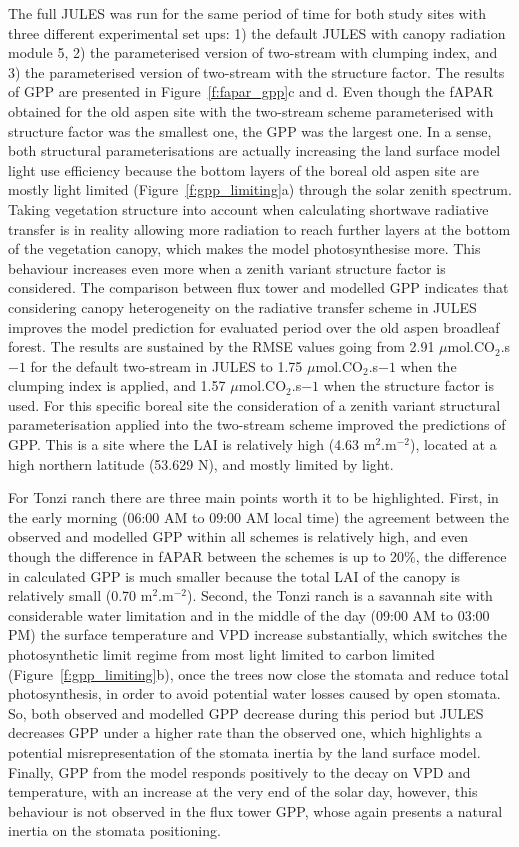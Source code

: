 \documentclass[a4paper,11pt]{report}
\begin{document}
The full JULES was run for the same period of time for both study sites with three different experimental set ups: 1) the default JULES with canopy radiation module 5, 2) the parameterised version of two-stream with clumping index, and 3) the parameterised version of two-stream with the structure factor. The results of GPP are presented in Figure~\ref{f:fapar_gpp}c and d.
Even though the fAPAR obtained for the old aspen site with the two-stream scheme parameterised with structure factor was the smallest one, the GPP was the largest one. In a sense, both structural parameterisations are actually increasing the land surface model light use efficiency because the bottom layers of the boreal old aspen site are mostly light limited (Figure~\ref{f:gpp_limiting}a) through the solar zenith spectrum. Taking vegetation structure into account when calculating shortwave radiative transfer is in reality allowing more radiation to reach further layers at the bottom of the vegetation canopy, which makes the model photosynthesise more. This behaviour increases even more when a zenith variant structure factor is considered. The comparison between flux tower and modelled GPP indicates that considering canopy heterogeneity on the radiative transfer scheme in JULES improves the model prediction for evaluated period over the old aspen broadleaf forest. The results are sustained by the RMSE values going from 2.91 $\mu$mol.CO$_2$.s$-1$ for the default two-stream in JULES to 1.75 $\mu$mol.CO$_2$.s$-1$ when the clumping index is applied, and 1.57 $\mu$mol.CO$_2$.s$-1$ when the structure factor is used. For this specific boreal site the consideration of a zenith variant structural parameterisation applied into the two-stream scheme improved the predictions of GPP. This is a site where the LAI is relatively high (4.63 m$^2$.m$^{-2}$), located at a high northern latitude (53.629 N), and mostly limited by light.

For Tonzi ranch there are three main points worth it to be highlighted. First, in the early morning (06:00 AM to 09:00 AM local time) the agreement between the observed and modelled GPP within all schemes is relatively high, and even though the difference in fAPAR between the schemes is up to 20\%, the difference in calculated GPP is much smaller because the total LAI of the canopy is relatively small (0.70 m$^2$.m$^{-2}$). Second, the Tonzi ranch is a savannah site with considerable water limitation and in the middle of the day (09:00 AM to 03:00 PM) the surface temperature and VPD increase substantially, which switches the photosynthetic limit regime from most light limited to carbon limited (Figure~\ref{f:gpp_limiting}b), once the trees now close the stomata and reduce total photosynthesis, in order to avoid potential water losses caused by open stomata. So, both observed and modelled GPP decrease during this period but JULES decreases GPP under a higher rate than the observed one, which highlights a potential misrepresentation of the stomata inertia by the land surface model. Finally, GPP from the model responds positively to the decay on VPD and temperature, with an increase at the very end of the solar day, however, this behaviour is not observed in the flux tower GPP, whose again presents a natural inertia on the stomata positioning.
\end{document}
